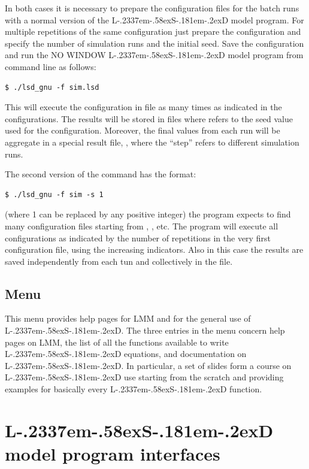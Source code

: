 \documentclass [11pt,a4paper] {book}
\def\LsD{{L\kern-.2337em\lower-.58ex\hbox{S}\kern-.181em\lower-.2ex\hbox{D}}\xspace}
\begin{document}
In both cases it is necessary to prepare the configuration files for the batch runs with a normal version of the \LsD model program. For multiple repetitions of the same configuration just prepare the configuration and specify the number of simulation runs and the initial seed. Save the configuration and run the NO WINDOW \LsD model program from command line as follows:

\begin{verbatim}
$ ./lsd_gnu -f sim.lsd
\end{verbatim} 

This will execute the configuration in file  as many times as indicated in the configurations. The results will be stored in files  where  refers to the seed value used for the configuration. Moreover, the final values from each run will be aggregate in a special result file, , where the ``step'' refers to different simulation runs.

The second version of the command has the format:

\begin{verbatim}
$ ./lsd_gnu -f sim -s 1
\end{verbatim} 

(where 1 can be replaced by any positive integer) the program expects to find many configuration files starting from , , etc. The program will execute all configurations as indicated by the number of repetitions in the very first configuration file, using the increasing indicators. Also in this case the results are saved independently from each tun and collectively in the  file.


\subsection{Menu }

This menu provides help pages for LMM and for the general use of \LsD. The three entries in the menu concern help pages on LMM, the list of all the functions available to write \LsD equations, and documentation on \LsD. In particular, a set of slides form a course on \LsD use starting from the scratch and providing examples for basically every \LsD function.


\section{\LsD model program interfaces}\label{sec:lsd}
\end{document}
